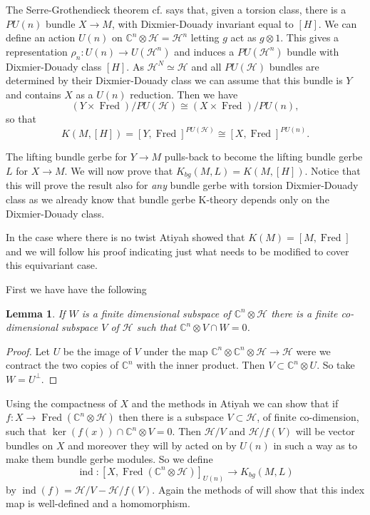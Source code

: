 \documentclass[a4paper,reqno]{amsart}
\DeclareMathOperator{\Fred}{Fred}
\DeclareMathOperator{\ind}{ind}
\theoremstyle{plain}
\newtheorem{lemma}[theorem]{Lemma}
\theoremstyle{definition}
\theoremstyle{remark}
\numberwithin{equation}{section}
\numberwithin{figure}{section}
\newcommand{\cH}{{\mathcal H}}
\newcommand{\CC}{{\mathbb C}}
\newcommand{\<}{\langle}
\renewcommand{\>}{\rangle}
\begin{document}
The Serre-Grothendieck theorem cf. \cite{DK} says that, given a
torsion class, there is a $PU(n)$ bundle $X\to M$, with Dixmier-Douady
invariant equal to $[H]$. We can define an action  $U(n)$ on $\CC^n
\otimes \cH = \cH^n$
letting $g$ act as $g \otimes 1$. This gives a
representation $\rho_n \colon U(n) \to U(\cH^n)$
and induces  a $PU(\cH^n)$ bundle with Dixmier-Douady
   class $[H]$. As $\cH^N \simeq \cH$ and all $PU(\cH)$
bundles are determined by their Dixmier-Douady class we can
assume that this bundle is $Y$ and contains $X$ as a $U(n)$
reduction.  Then we have
$$
(Y \times \Fred)/PU(\mathcal H)  \cong (X \times \Fred)/PU(n),
$$
so that
$$
K(M,  [H]) = [Y, \Fred]^{PU(\mathcal H)} \cong [X, \Fred]^{PU(n)}.
$$


The lifting bundle gerbe for $Y \to M$ pulls-back to become the lifting
bundle gerbe $L$ for $X \to M$.  We will now prove that $K_{bg}(M, L)
= K(M, [H])$. Notice
that this will prove the result also for {\em any} bundle gerbe with
torsion Dixmier-Douady class as we already know that bundle gerbe K-theory
depends only on the Dixmier-Douady class.

In the case where there is no twist Atiyah showed that $K(M) = [M,
\Fred]$ and we
will follow his proof indicating just what needs to be modified to
cover this equivariant case.

First we have have the following
\begin{lemma} If $W$ is  a finite dimensional subspace of $\CC^n
\otimes \cH$ there
is a finite co-dimensional subspace $V$ of $\cH$ such that $\CC^n \otimes V
\cap W = 0$.
\end{lemma}
\begin{proof} Let $U$ be  the image of $V$ under the map $\CC^n
\otimes \CC^n \otimes
\cH \to \cH$ were we contract the two copies of $\CC^n$ with the inner
product. Then $V \subset \CC^n \otimes U$. So take $W = U^{\perp}$.
\end{proof}

Using the compactness of $X$ and the methods in Atiyah we can show that if
$f \colon X \to \Fred(\CC^n \otimes \cH)$ then there is a
   subspace $V \subset \cH$, of finite co-dimension, such that
$\ker(f(x)) \cap \CC^n \otimes V = 0$. Then $\cH/V$ and $\cH/f(V)$
will be vector bundles
on $X$ and moreover they will  by acted on by $U(n)$ in such a way as to make
them bundle gerbe modules.  So we define
$$
\ind \colon [X, \Fred(\CC^n \otimes \cH ) ] _{U(n)}\to K_{bg}(M, L)
$$
by $\ind(f) = \cH/V -\cH/f(V)$. Again the methods of \cite{Ati} will show that
this index map is well-defined and a homomorphism.
\end{document}
